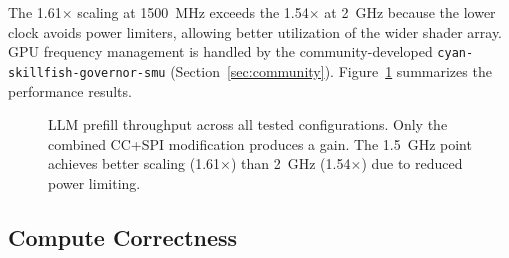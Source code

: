 \documentclass[11pt,twocolumn]{article}
\begin{document}
The 1.61$\times$ scaling at 1500~MHz exceeds the 1.54$\times$ at 2~GHz because the lower clock avoids power limiters, allowing better utilization of the wider shader array. GPU frequency management is handled by the community-developed \texttt{cyan-skillfish-governor-smu} (Section~\ref{sec:community}). Figure~\ref{fig:perf} summarizes the performance results.

\begin{figure}[H]
\centering
{}
\caption{LLM prefill throughput across all tested configurations. Only the combined CC+SPI modification produces a gain. The 1.5~GHz point achieves better scaling (1.61$\times$) than 2~GHz (1.54$\times$) due to reduced power limiting.}
\label{fig:perf}
\end{figure}

\subsection{Compute Correctness}
\end{document}
